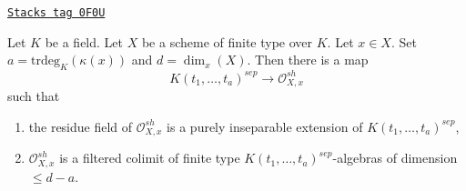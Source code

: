 \begin{lemma}
\label{etale-cohomology-lemma-strictly-henselian}
\href{https://stacks.math.columbia.edu/tag/0F0U}{\texttt{Stacks tag 0F0U}}

Let $K$ be a field. Let $X$ be a scheme of finite type over $K$.
Let $x \in X$. Set $a = \text{trdeg}_K(\kappa(x))$
and $d = \dim_x(X)$. Then there is a map
$$
K(t_1, \ldots, t_a)^{sep} \longrightarrow \mathcal{O}_{X, x}^{sh}
$$
such that
\begin{enumerate}
\item the residue field of $\mathcal{O}_{X, x}^{sh}$ is a purely inseparable
extension of $K(t_1, \ldots, t_a)^{sep}$,
\item $\mathcal{O}_{X, x}^{sh}$ is a filtered colimit of finite
type $K(t_1, \ldots, t_a)^{sep}$-algebras of dimension $\leq d - a$.
\end{enumerate}
\end{lemma}

